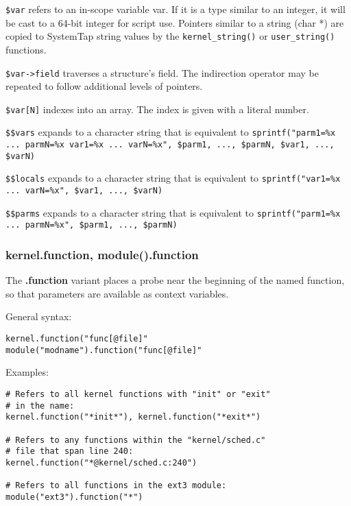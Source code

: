 \documentclass[twoside,english]{article}
\newenvironment{vindent}
{\begin{list}{}{\setlength{\listparindent}{6pt}}
\item[]}
{\end{list}}
\begin{document}
\texttt{\$var} refers to an in-scope variable var. If it is a type similar
to an integer, it will be cast to a 64-bit integer for script use. Pointers
similar to a string (char {*}) are copied to SystemTap string values by the
\texttt{kernel\_string()} or \texttt{user\_string()} functions.

\texttt{\$var->field} traverses a structure's field. The indirection operator
may be repeated to follow additional levels of pointers.

\texttt{\$var{[}N]} indexes into an array. The index is given with a literal
number.

\texttt{\$\$vars} expands to a character string that is equivalent to
\texttt{sprintf("parm1=\%x ... parmN=\%x var1=\%x ... varN=\%x", \$parm1, ..., \$parmN,
\$var1, ..., \$varN)}

\texttt{\$\$locals} expands to a character string that is equivalent to
\texttt{sprintf("var1=\%x ... varN=\%x", \$var1, ..., \$varN)}

\texttt{\$\$parms} expands to a character string that is equivalent to
\texttt{sprintf("parm1=\%x ... parmN=\%x", \$parm1, ..., \$parmN)}


\subsubsection{kernel.function, module().function}
The \textbf{.function} variant places a probe near the beginning of the named function,
so that parameters are available as context variables.

General syntax:

\begin{vindent}
\begin{verbatim}
kernel.function("func[@file]"
module("modname").function("func[@file]"
\end{verbatim}
\end{vindent}
Examples:

\begin{vindent}
\begin{verbatim}
# Refers to all kernel functions with "init" or "exit"
# in the name:
kernel.function("*init*"), kernel.function("*exit*")

# Refers to any functions within the "kernel/sched.c"
# file that span line 240:
kernel.function("*@kernel/sched.c:240")

# Refers to all functions in the ext3 module:
module("ext3").function("*")
\end{verbatim}
\end{vindent}
\end{document}
